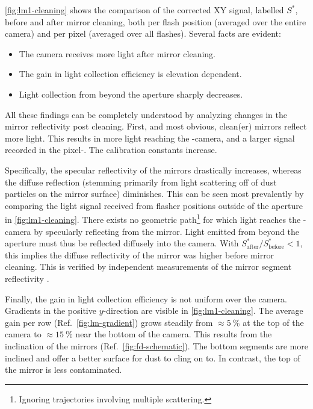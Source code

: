 \cref{fig:lm1-cleaning} shows the comparison of the corrected XY signal, 
labelled $S^*$, before and after mirror cleaning, both per flash position 
(averaged over the entire camera) and per pixel (averaged over all flashes). 
Several facts are evident:

\vspace{0.2cm}
\begin{itemize}
\item The camera receives more light after mirror cleaning.
\item The gain in light collection efficiency is elevation dependent.
\item Light collection from beyond the aperture sharply decreases.
\end{itemize}
\vspace{0.2cm}

All these findings can be completely understood by analyzing changes in the
mirror reflectivity post cleaning. First, and most obvious, clean(er) mirrors 
reflect more light. This results in more light reaching the \FD-camera, and a 
larger signal recorded in the pixel-\PMTs. The calibration constants increase.

Specifically, the specular reflectivity of the mirrors drastically increases,
whereas the diffuse reflection (stemming primarily from light scattering off of
dust particles on the mirror surface) diminishes. This can be seen most 
prevalently by comparing the light signal received from flasher positions 
outside of the aperture in \cref{fig:lm1-cleaning}. There exists no geometric 
path\footnote{Ignoring trajectories involving multiple scattering.} for which 
light reaches the \FD-camera by specularly reflecting from the mirror. Light 
emitted from beyond the aperture must thus be reflected diffusely into the 
camera. With $S^*_\mathrm{after}/S^*_\mathrm{before} < 1$, this implies the 
diffuse reflectivity of the mirror was higher before mirror cleaning. This is 
verified by independent measurements of the mirror segment reflectivity 
\cite{filipJumpsXYCalibration2024, GAP2026_001DescriptionResults}.

Finally, the gain in light collection efficiency is not uniform over the
camera. Gradients in the positive $y$-direction are visible in 
\cref{fig:lm1-cleaning}. The average gain per row (Ref.~\cref{fig:lm-gradient}) 
grows steadily from $\approx\SI{5}{\percent}$ at the top of the camera to 
$\approx\SI{15}{\percent}$ near the bottom of the camera. This results from the
inclination of the \FD mirrors (Ref.~\cref{fig:fd-schematic}). The bottom 
segments are more inclined and offer a better surface for dust to cling on to.
In contrast, the top of the mirror is less contaminated.

